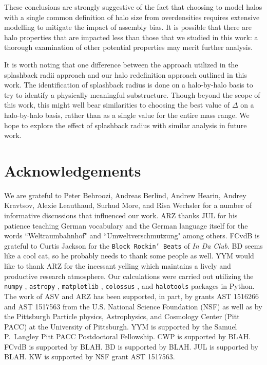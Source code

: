 \documentclass[usenatbib,fleqn]{mnras}
\begin{document}
These conclusions are strongly suggestive of the fact that choosing to model halos with a single common definition of halo size from overdensities requires extensive modelling to mitigate the impact of assembly bias. It is possible that there are halo properties that are impacted less than those that we studied in this work: a thorough examination of other potential properties may merit further analysis.

It is worth noting that one difference between the approach utilized in the splashback radii approach \citep{more_etal15,diemer_etal17} and our halo redefinition approach outlined in this work. The identification of splashback radius is done on a halo-by-halo basis to try to identify a physically meaningful substructure. Though beyond the scope of this work, this might well bear similarities to choosing the best value of $\Delta$ on a halo-by-halo basis, rather than as a single value for the entire mass range. We hope to explore the effect of splashback radius with similar analysis in future work.


\section*{Acknowledgements}

We are grateful to Peter Behroozi, Andreas Berlind, Andrew Hearin, Andrey Kravtsov, Alexie Leauthaud, Surhud More, and Risa Wechsler for a number of informative discussions that influenced our work. ARZ thanks JUL for his patience teaching German vocabulary and the German language itself for the words ``Weltraumbahnhof" and ``Umweltverschmutzung" among others. FCvdB is grateful to Curtis Jackson for the {\tt Block Rockin' Beats} of {\em In Da Club}. BD seems like a cool cat, so he probably needs to thank some people as well. YYM would like to thank ARZ for the incessant yelling which maintains a lively and productive research atmosphere. Our calculations were carried out utilizing the {\tt numpy} \citep{numpy}, {\tt astropy} \citep{astropy}, {\tt matplotlib} \citep{matplotlib}, {\tt colossus} \citep{diemer_kravtsov15}, and {\tt halotools} \citep{halotools} packages in Python. The work of ASV and ARZ has been supported, in part, by grants AST 1516266 and AST 1517563 from the U.S. National Science Foundation (NSF) as well as by the Pittsburgh Particle physics, Astrophysics, and Cosmology Center (Pitt PACC) at the University of Pittsburgh. YYM is supported by the Samuel P.\ Langley Pitt PACC Postdoctoral Fellowship. CWP is supported by BLAH. FCvdB is supported by BLAH. BD is supported by BLAH. JUL is supported by BLAH. KW is supported by NSF grant AST 1517563. 




\label{lastpage}
\end{document}
